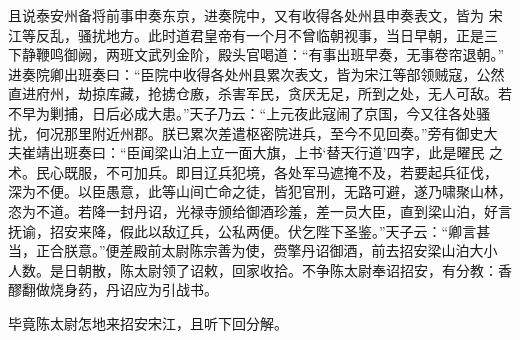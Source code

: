 且说泰安州备将前事申奏东京，进奏院中，又有收得各处州县申奏表文，皆为
宋江等反乱，骚扰地方。此时道君皇帝有一个月不曾临朝视事，当日早朝，正是三
下静鞭鸣御阙，两班文武列金阶，殿头官喝道：“有事出班早奏，无事卷帘退朝。”
进奏院卿出班奏曰：“臣院中收得各处州县累次表文，皆为宋江等部领贼寇，公然
直进府州，劫掠库藏，抢掳仓廒，杀害军民，贪厌无足，所到之处，无人可敌。若
不早为剿捕，日后必成大患。”天子乃云：“上元夜此寇闹了京国，今又往各处骚
扰，何况那里附近州郡。朕已累次差遣枢密院进兵，至今不见回奏。”旁有御史大
夫崔靖出班奏曰：“臣闻梁山泊上立一面大旗，上书‘替天行道’四字，此是曜民
之术。民心既服，不可加兵。即目辽兵犯境，各处军马遮掩不及，若要起兵征伐，
深为不便。以臣愚意，此等山间亡命之徒，皆犯官刑，无路可避，遂乃啸聚山林，
恣为不道。若降一封丹诏，光禄寺颁给御酒珍羞，差一员大臣，直到梁山泊，好言
抚谕，招安来降，假此以敌辽兵，公私两便。伏乞陛下圣鉴。”天子云：“卿言甚
当，正合朕意。”便差殿前太尉陈宗善为使，赍擎丹诏御酒，前去招安梁山泊大小
人数。是日朝散，陈太尉领了诏敕，回家收拾。不争陈太尉奉诏招安，有分教：香
醪翻做烧身药，丹诏应为引战书。

毕竟陈太尉怎地来招安宋江，且听下回分解。